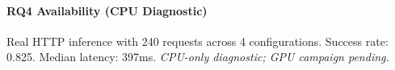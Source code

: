 \paragraph{RQ4 Availability (CPU Diagnostic)}
Real HTTP inference with 240 requests across 4 configurations. Success rate: 0.825. Median latency: 397ms. \textit{CPU-only diagnostic; GPU campaign pending.}